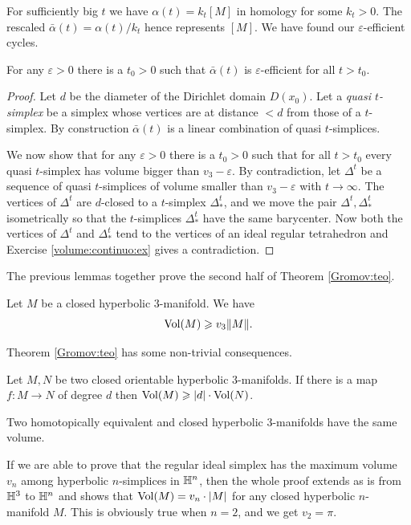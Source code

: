 For sufficiently big $t$ we have $\alpha(t) = k_t[M]$ in homology for some $k_t>0$. The rescaled $\bar\alpha(t) = \alpha(t)/k_t$ hence represents $[M]$.
We have found our $\varepsilon$-efficient cycles. 

\begin{lemma} \label{efficiente:lemma}
For any $\varepsilon>0$ there is a $t_0>0$ such that $\bar\alpha(t)$ is $\varepsilon$-efficient for all $t>t_0$.
\end{lemma}
\begin{proof}
Let $d$ be the diameter of the Dirichlet domain $D(x_0)$. Let a \emph{quasi $t$-simplex} be a simplex whose vertices are at distance $<d$ from those of a $t$-simplex. By construction $\bar\alpha(t)$ is a linear combination of quasi $t$-simplices.

We now show that for any $\varepsilon>0$ there is a $t_0>0$ such that for all $t>t_0$ every quasi $t$-simplex has volume bigger than $v_3-\varepsilon$. By contradiction, let $\Delta^t$ be a sequence of quasi $t$-simplices of volume smaller than $v_3-\varepsilon$ with $t\to\infty$. The vertices of $\Delta^t$ are $d$-closed to a $t$-simplex $\Delta_*^t$, and we move the pair $\Delta^t, \Delta^t_*$ isometrically so that the $t$-simplices $\Delta_*^t$ have the same barycenter. Now both the vertices of $\Delta^t$ and $\Delta^t_*$ tend to the vertices of an ideal regular tetrahedron and Exercise \ref{volume:continuo:ex} gives a contradiction.
\end{proof}

The previous lemmas together prove the second half of Theorem \ref{Gromov:teo}.
\begin{cor}
Let $M$ be a closed hyperbolic $3$-manifold. We have
$${\rm Vol}(M) \geqslant v_3 \|M\|.$$
\end{cor}

Theorem \ref{Gromov:teo} has some non-trivial consequences.

\begin{cor} \label{degree:d:cor}
Let  $M, N$ be two closed orientable hyperbolic $3$-manifolds. If there is a map $f\colon M\to N$ of degree $d$ then ${\rm Vol}(M)\geqslant |d| \cdot {\rm Vol}(N)$.
\end{cor}

\begin{cor} \label{stesso:volume:cor}
Two homotopically equivalent and closed hyperbolic 3-manifolds have the same volume.
\end{cor}

\begin{rem}
If we are able to prove that the regular ideal simplex has the maximum volume $v_n$ among hyperbolic $n$-simplices in $\mathbb{H}^n$, then the whole proof extends as is from $\mathbb{H}^3$ to $\mathbb{H}^n$ and shows that ${\rm Vol}(M) = v_n \cdot |M|$ for any closed hyperbolic $n$-manifold $M$. This is obviously true when $n=2$, and we get $v_2 = \pi$. 
\end{rem}

